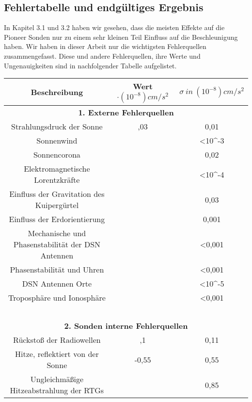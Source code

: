 \bigskip

\subsection{ Fehlertabelle und endg\"ultiges Ergebnis}

In Kapitel 3.1 und 3.2 haben wir gesehen, dass die meisten Effekte auf
die Pioneer Sonden nur zu einem sehr kleinen Teil Einfluss auf die
Beschleunigung haben. Wir haben in dieser Arbeit nur die wichtigsten
Fehlerquellen zusammengefasst. Diese und andere Fehlerquellen, ihre
Werte und Ungenauigkeiten sind in nachfolgender Tabelle aufgelistet.


\bigskip
\begin{table}[htbn]
\newcommand{\mc}[3]{\multicolumn{#1}{#2}{#3}}
\centering
\begin{tabular}{|c|c|c|}
\hline
Beschreibung &
Wert $\cdot (10^{-8}) cm/s^2$ &
$\sigma\ in\ (10^{-8}) cm/s^2$\\ \hline
\mc{3}{|c|}{\bf 1. Externe Fehlerquellen} \\ \hline
Strahlungsdruck der Sonne &
\raggedleft 0,03 &
 0,01\\ \hline
Sonnenwind &
~
 &
 {\textless}10\^{}-3\\ \hline
Sonnencorona &
~
 &
 0,02\\ \hline
Elektromagnetische Lorentzkr\"afte &
~
 &
 {\textless}10\^{}-4\\ \hline
Einfluss der Gravitation des Kuiperg\"urtel &
~
 &
 0,03\\ \hline
Einfluss der Erdorientierung &
~
 &
 0,001\\ \hline
Mechanische und Phasenstabilit\"at der DSN Antennen &
~
 &
 {\textless}0,001\\ \hline
Phasenstabilit\"at und Uhren &
~
 &
 {\textless}0,001\\ \hline
DSN Antennen Orte &
~
 &
 {\textless}10\^{}-5\\ \hline
Troposph\"are und Ionosph\"are &
~
 &
 {\textless}0,001\\ \hline
~
 &
~
 &
~
\\ \hline
\mc{3}{|c|}{\bf 2. Sonden interne Fehlerquellen}\\ \hline
R\"ucksto{\ss} der Radiowellen &
\raggedleft 1,1 &
 0,11\\ \hline
Hitze, reflektiert von der Sonne &
\raggedleft {}-0,55 &
 0,55\\ \hline
Ungleichm\"a{\ss}ige Hitzeabstrahlung der RTGs &
~
 &
 0,85\\ \hline

\end{tabular}
\end{table}
